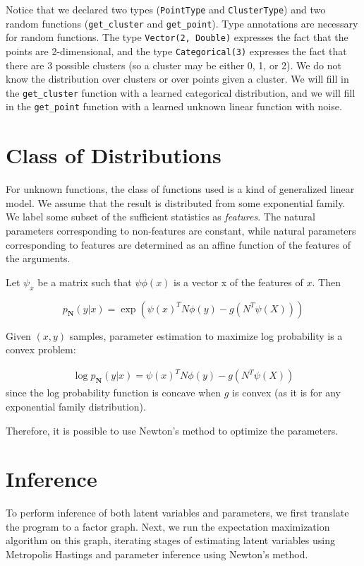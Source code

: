 \documentclass[proceed]{article}
\begin{document}
  Notice that we declared two types (\texttt{PointType} and \texttt{ClusterType})
  and two random functions (\texttt{get\_cluster} and \texttt{get\_point}).
  Type annotations are necessary for random functions.  The type
  \texttt{Vector(2, Double)} expresses the fact that the points are 2-dimensional,
  and the type \texttt{Categorical(3)} expresses the fact that there are 3
  possible clusters (so a cluster may be either 0, 1, or 2).  We do not know
  the distribution over clusters or over points given a cluster.
  We will fill in the \texttt{get\_cluster} function with
  a learned categorical distribution, and we will fill in the
  \texttt{get\_point} function with a learned unknown linear function with noise.

  \section{Class of Distributions}

    For unknown functions, the class of functions used is a kind
    of generalized linear model.  We assume that the result
    is distributed from some exponential family.  We label
    some subset of the sufficient statistics as \emph{features}.  The natural
    parameters corresponding to non-features are constant, while natural
    parameters corresponding to features are determined as an affine
    function of the features of the arguments.

    Let $\psi_x$ be a matrix such that $\psi \phi(x)$ is a vector x of the
    features of $x$.  Then

    $$p_{\mathbf{N}}(y | x) = \exp(\psi(x)^T N \phi(y) - g(N^T \psi(X)))$$

    Given $(x, y)$ samples, parameter estimation to maximize log probability is a convex
    problem:

    \begin{align*}
      \log p_{\mathbf{N}}(y | x) = \psi(x)^T N \phi(y) - g(N^T \psi(X))
    \end{align*}
    since the log probability function is concave when $g$ is convex (as it is
    for any exponential family distribution).

    Therefore, it is possible to use Newton's method to optimize the parameters.

  \section{Inference}

    To perform inference of both latent variables and parameters, we first
    translate the program to a factor graph.  Next, we run the
    expectation maximization algorithm on this graph, iterating stages of
    estimating latent variables using Metropolis Hastings and parameter
    inference using Newton's method.
\end{document}
